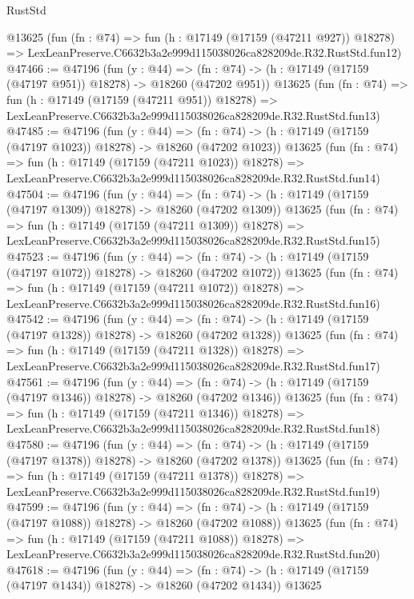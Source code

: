 \begin{lexlean}{RustStd}
\begin{coremodule}
    @13625
    (fun (fn : @74) =>
    fun (h : @17149 (@17159 (@47211 @927)) @18278) =>
    LexLeanPreserve.C6632b3a2e999d115038026ca828209de.R32.RustStd.fun12)
@47466 := @47196
    (fun (y : @44) =>
    (fn : @74) -> (h : @17149 (@17159 (@47197 @951)) @18278) -> @18260 (@47202 @951))
    @13625
    (fun (fn : @74) =>
    fun (h : @17149 (@17159 (@47211 @951)) @18278) =>
    LexLeanPreserve.C6632b3a2e999d115038026ca828209de.R32.RustStd.fun13)
@47485 := @47196
    (fun (y : @44) =>
    (fn : @74) -> (h : @17149 (@17159 (@47197 @1023)) @18278) -> @18260 (@47202 @1023))
    @13625
    (fun (fn : @74) =>
    fun (h : @17149 (@17159 (@47211 @1023)) @18278) =>
    LexLeanPreserve.C6632b3a2e999d115038026ca828209de.R32.RustStd.fun14)
@47504 := @47196
    (fun (y : @44) =>
    (fn : @74) -> (h : @17149 (@17159 (@47197 @1309)) @18278) -> @18260 (@47202 @1309))
    @13625
    (fun (fn : @74) =>
    fun (h : @17149 (@17159 (@47211 @1309)) @18278) =>
    LexLeanPreserve.C6632b3a2e999d115038026ca828209de.R32.RustStd.fun15)
@47523 := @47196
    (fun (y : @44) =>
    (fn : @74) -> (h : @17149 (@17159 (@47197 @1072)) @18278) -> @18260 (@47202 @1072))
    @13625
    (fun (fn : @74) =>
    fun (h : @17149 (@17159 (@47211 @1072)) @18278) =>
    LexLeanPreserve.C6632b3a2e999d115038026ca828209de.R32.RustStd.fun16)
@47542 := @47196
    (fun (y : @44) =>
    (fn : @74) -> (h : @17149 (@17159 (@47197 @1328)) @18278) -> @18260 (@47202 @1328))
    @13625
    (fun (fn : @74) =>
    fun (h : @17149 (@17159 (@47211 @1328)) @18278) =>
    LexLeanPreserve.C6632b3a2e999d115038026ca828209de.R32.RustStd.fun17)
@47561 := @47196
    (fun (y : @44) =>
    (fn : @74) -> (h : @17149 (@17159 (@47197 @1346)) @18278) -> @18260 (@47202 @1346))
    @13625
    (fun (fn : @74) =>
    fun (h : @17149 (@17159 (@47211 @1346)) @18278) =>
    LexLeanPreserve.C6632b3a2e999d115038026ca828209de.R32.RustStd.fun18)
@47580 := @47196
    (fun (y : @44) =>
    (fn : @74) -> (h : @17149 (@17159 (@47197 @1378)) @18278) -> @18260 (@47202 @1378))
    @13625
    (fun (fn : @74) =>
    fun (h : @17149 (@17159 (@47211 @1378)) @18278) =>
    LexLeanPreserve.C6632b3a2e999d115038026ca828209de.R32.RustStd.fun19)
@47599 := @47196
    (fun (y : @44) =>
    (fn : @74) -> (h : @17149 (@17159 (@47197 @1088)) @18278) -> @18260 (@47202 @1088))
    @13625
    (fun (fn : @74) =>
    fun (h : @17149 (@17159 (@47211 @1088)) @18278) =>
    LexLeanPreserve.C6632b3a2e999d115038026ca828209de.R32.RustStd.fun20)
@47618 := @47196
    (fun (y : @44) =>
    (fn : @74) -> (h : @17149 (@17159 (@47197 @1434)) @18278) -> @18260 (@47202 @1434))
    @13625

\end{coremodule}
\end{lexlean}
